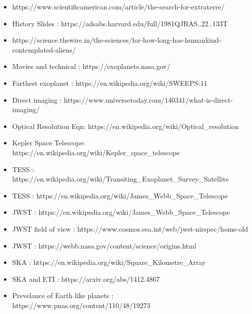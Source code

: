 \documentclass{beamer}
\begin{document}
%
%

\begin{frame}
\begin{itemize}
    \item \scriptsize{https://www.scientificamerican.com/article/the-search-for-extraterre/}
    \item History Slides : \scriptsize{https://adsabs.harvard.edu/full/1981QJRAS..22..133T}
    \item \scriptsize{https://science.thewire.in/the-sciences/for-how-long-has-humankind-contemplated-aliens/}
    \item Movies and technical : \scriptsize{https://exoplanets.nasa.gov/}
    \item Farthest exoplanet : \scriptsize{https://en.wikipedia.org/wiki/SWEEPS-11}
    \item Direct imaging : \scriptsize{https://www.universetoday.com/140341/what-is-direct-imaging/}
    \item Optical Resolution Eqn: \scriptsize{https://en.wikipedia.org/wiki/Optical\_resolution}
    \item Kepler Space Telescope: \scriptsize{https://en.wikipedia.org/wiki/Kepler\_space\_telescope}
    \item TESS : \scriptsize{https://en.wikipedia.org/wiki/Transiting\_Exoplanet\_Survey\_Satellite}
    \item TESS : \scriptsize{https://en.wikipedia.org/wiki/James\_Webb\_Space\_Telescope}
    \item JWST : \scriptsize{https://en.wikipedia.org/wiki/James\_Webb\_Space\_Telescope}
    \item JWST field of view : \scriptsize{https://www.cosmos.esa.int/web/jwst-nirspec/home-old}
    \item JWST : \scriptsize{https://webb.nasa.gov/content/science/origins.html}
    \item SKA : \scriptsize{https://en.wikipedia.org/wiki/Square\_Kilometre\_Array}
    \item SKA and ETI : \scriptsize{https://arxiv.org/abs/1412.4867}
    \item Prevelance of Earth like planets : \scriptsize{https://www.pnas.org/content/110/48/19273}
\end{itemize}
\end{frame}
\end{document}
